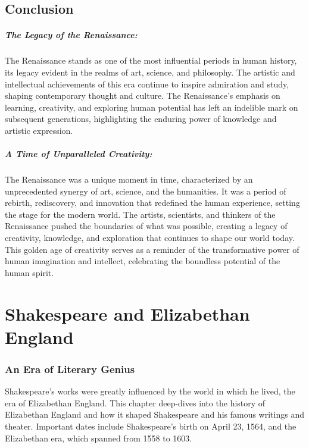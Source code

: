 \documentclass[a4paper,12pt]{book}
\begin{document}
\section*{Conclusion}

\paragraph{The Legacy of the Renaissance:}
The Renaissance stands as one of the most influential periods in human history, its legacy evident in the realms of art, science, and philosophy. The artistic and intellectual achievements of this era continue to inspire admiration and study, shaping contemporary thought and culture. The Renaissance’s emphasis on learning, creativity, and exploring human potential has left an indelible mark on subsequent generations, highlighting the enduring power of knowledge and artistic expression.

\paragraph{A Time of Unparalleled Creativity:}
The Renaissance was a unique moment in time, characterized by an unprecedented synergy of art, science, and the humanities. It was a period of rebirth, rediscovery, and innovation that redefined the human experience, setting the stage for the modern world. The artists, scientists, and thinkers of the Renaissance pushed the boundaries of what was possible, creating a legacy of creativity, knowledge, and exploration that continues to shape our world today. This golden age of creativity serves as a reminder of the transformative power of human imagination and intellect, celebrating the boundless potential of the human spirit.



\chapter{Shakespeare and Elizabethan England}
\subsection*{An Era of Literary Genius}
Shakespeare's works were greatly influenced by the world in which he lived, the era of Elizabethan England. This chapter deep-dives into the history of Elizabethan England and how it shaped Shakespeare and his famous writings and theater. Important dates include Shakespeare's birth on April 23, 1564, and the Elizabethan era, which spanned from 1558 to 1603.
\end{document}
